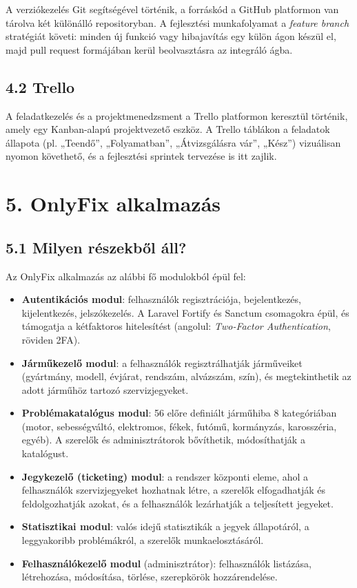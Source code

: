 A verziókezelés Git segítségével történik, a forráskód a GitHub platformon van tárolva két különálló repositoryban. A fejlesztési munkafolyamat a \emph{feature branch} stratégiát követi: minden új funkció vagy hibajavítás egy külön ágon készül el, majd pull request formájában kerül beolvasztásra az integráló ágba.

\subsection{4.2 Trello}\label{trello}

A feladatkezelés és a projektmenedzsment a Trello platformon keresztül történik, amely egy Kanban-alapú projektvezető eszköz. A Trello táblákon a feladatok állapota (pl. „Teendő'', „Folyamatban'', „Átvizsgálásra vár'', „Kész'') vizuálisan nyomon követhető, és a fejlesztési sprintek tervezése is itt zajlik.

\protect{}\label{_Toc223012186}{}

\section{5. OnlyFix alkalmazás}\label{onlyfix-alkalmazuxe1s}

\subsection{5.1 Milyen részekből áll?}\label{milyen-ruxe9szekbux151l-uxe1ll}

Az OnlyFix alkalmazás az alábbi fő modulokból épül fel:

\begin{itemize}
\item
  \textbf{Autentikációs modul}: felhasználók regisztrációja, bejelentkezés, kijelentkezés, jelszókezelés. A Laravel Fortify és Sanctum csomagokra épül, és támogatja a kétfaktoros hitelesítést (angolul: \emph{Two-Factor Authentication}, röviden 2FA).
\item
  \textbf{Járműkezelő modul}: a felhasználók regisztrálhatják járműveiket (gyártmány, modell, évjárat, rendszám, alvázszám, szín), és megtekinthetik az adott járműhöz tartozó szervizjegyeket.
\item
  \textbf{Problémakatalógus modul}: 56 előre definiált járműhiba 8 kategóriában (motor, sebességváltó, elektromos, fékek, futómű, kormányzás, karosszéria, egyéb). A szerelők és adminisztrátorok bővíthetik, módosíthatják a katalógust.
\item
  \textbf{Jegykezelő (ticketing) modul}: a rendszer központi eleme, ahol a felhasználók szervizjegyeket hozhatnak létre, a szerelők elfogadhatják és feldolgozhatják azokat, és a felhasználók lezárhatják a teljesített jegyeket.
\item
  \textbf{Statisztikai modul}: valós idejű statisztikák a jegyek állapotáról, a leggyakoribb problémákról, a szerelők munkaelosztásáról.
\item
  \textbf{Felhasználókezelő modul} (adminisztrátor): felhasználók listázása, létrehozása, módosítása, törlése, szerepkörök hozzárendelése.
\end{itemize}


